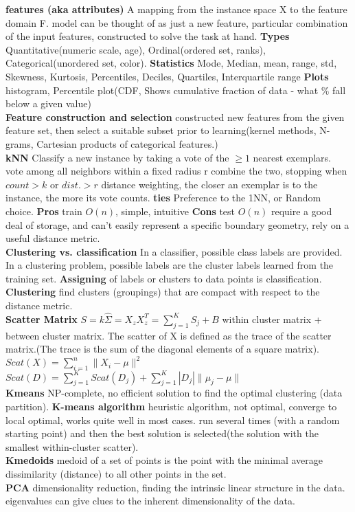 \documentclass[cheatsheet.tex]{subfiles}
\begin{document}
\textbf{features (aka attributes)} A mapping from the instance space X to the feature domain F. model can be thought of as just a new feature, particular combination of the input features, constructed to solve the task at hand. \textbf{Types} Quantitative(numeric scale, age), Ordinal(ordered set, ranks), Categorical(unordered set, color). \textbf{Statistics} Mode, Median, mean, range, std, Skewness, Kurtosis, Percentiles, Deciles, Quartiles, Interquartile range \textbf{Plots} histogram, Percentile plot(CDF, Shows cumulative fraction of data - what \% fall below a given value)
\\
\textbf{Feature construction and selection} constructed new features from the given feature set, then select a suitable subset prior to learning(kernel methods, N-grams, Cartesian products of categorical features.)
\\
\textbf{kNN} \textbullet Classify a new instance by taking a vote of the $\geq1$ nearest exemplars. \textbullet vote among all neighbors within a fixed radius r \textbullet combine the two, stopping when $count > k$ or $dist. > r$ \textbullet distance weighting, the closer an exemplar is to the instance, the more its vote counts. \textbf{ties} Preference to the 1NN, or Random choice. 
\textbf{Pros} train $O(n)$, simple, intuitive 
\textbf{Cons} test $O(n)$ require a good deal of storage, and can't easily represent a specific boundary geometry, rely on a useful distance metric.
\\
\textbf{Clustering vs. classification} In a classifier, possible class labels are provided. In a clustering problem, possible labels are the cluster labels learned from the training set. \textbf{Assigning} of labels or clusters to data points is classification.
\\
\textbf{Clustering} find clusters (groupings) that are compact with respect to the distance metric. 
\\
\textbf{Scatter Matrix} $S=k\hat{\Sigma}=X_zX_z^T=\sum^{K}_{j=1}S_j+B$ within cluster matrix + between cluster matrix. The scatter of X is defined as the trace of the scatter matrix.(The trace is the sum of the diagonal elements of a square matrix). 
$Scat(X)=\sum^n_{i=1}\|X_i-\mu\|^2$ $Scat(D)=\sum^K_{j=1}Scat(D_j)+\sum^K_{j=1}|D_j|\|\mu_j-\mu\|$
\\
\textbf{Kmeans} NP-complete, no efficient solution to find the optimal clustering (data partition). \textbf{K-means algorithm} heuristic algorithm, not optimal, converge to local optimal, works quite well in most cases. run several times (with a random starting point) and then the best solution is selected(the solution with the smallest within-cluster scatter). 
\\
\textbf{Kmedoids} medoid of a set of points is the point with the minimal average dissimilarity (distance) to all other points in the set. 
\\
\textbf{PCA} dimensionality reduction, finding the intrinsic linear structure in the data. eigenvalues can give clues to the inherent dimensionality of the data. 
\end{document}

